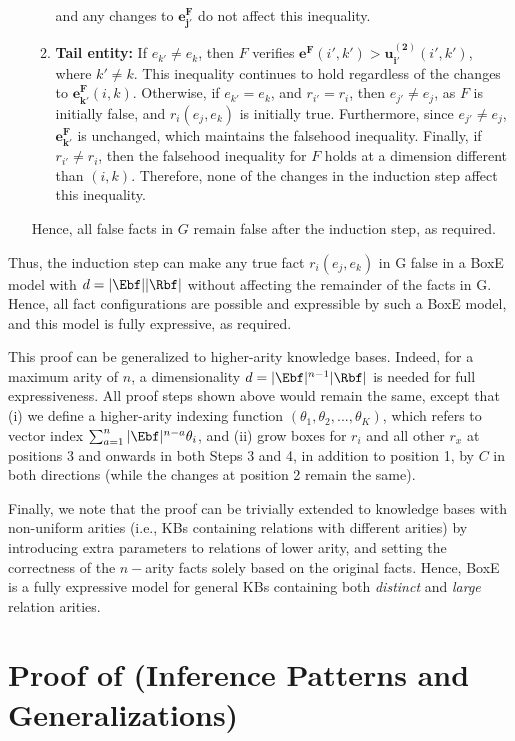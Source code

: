 \documentclass{article}
\begin{document}
\begin{enumerate}[{Case} 1.]
\begin{enumerate}
        and any changes to $\bm{e_{j'}^F}$ do not affect this inequality.
        \item \textbf{Tail entity:} If $e_{k'} \neq e_k$, then $F$ verifies $\bm{e^F}(i',k') > \bm{u_{i'}^{(2)}}(i',k')$, where $k' \neq k$. This inequality continues to hold regardless of the changes to $\bm{e_{k'}^F}(i,k)$. Otherwise, if $e_{k'} = e_k$, and $r_{i'} = r_i$, then $e_{j'} \neq e_j$, as $F$ is initially false, and $r_i(e_j,e_k)$ is initially true.  Furthermore, since $e_{j'} \neq e_j$, $\bm{e_{k'}^{F}}$ is unchanged, which maintains the falsehood inequality. Finally, if $r_{i'} \neq r_i$, then the falsehood inequality for $F$ holds at a dimension different than $(i,k)$. Therefore, none of the changes in the induction step affect this inequality.
    \end{enumerate}
    Hence, all false facts in $G$ remain false after the induction step, as required. 
\end{enumerate}

Thus, the induction step can make any true fact $r_i(e_j, e_k)$ in G false in a BoxE model with $d = |\Ebf||\Rbf|$ without affecting the remainder of the facts in G. Hence, all fact configurations are possible and expressible by such a BoxE model, and this model is fully expressive, as required.

This proof can be generalized to higher-arity knowledge bases. Indeed, for a maximum arity of $n$, a dimensionality $d = |\Ebf|^{n-1}|\Rbf|$ is needed for full expressiveness. All proof steps shown above would remain the same, except that (i) we define a higher-arity indexing function $(\theta_1, \theta_2, ..., \theta_K)$, which refers to vector index $\sum_{a=1}^n |\Ebf|^{n-a} \theta_i$, and (ii) grow boxes for $r_i$ and all other $r_x$ at positions 3 and onwards in both Steps 3 and 4, in addition to position 1, by $C$ in both directions (while the changes at position 2 remain the same). 

Finally, we note that the proof can be trivially extended to knowledge bases with non-uniform arities (i.e., KBs containing relations with different arities) by introducing extra parameters to relations of lower arity, and setting the correctness of the $n-$arity facts solely based on the original facts. Hence, BoxE is a fully expressive model for general KBs containing both \emph{distinct} and \emph{large} relation arities.

\section{Proof of  (Inference Patterns and Generalizations)}
\label{app:infPat}
\end{document}
